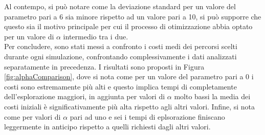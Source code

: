 Al contempo, si può notare come la deviazione standard per un valore del parametro pari a 6 sia minore rispetto ad un valore pari a 10, si può supporre che questo sia il motivo principale per cui il processo di otimizzazione abbia optato per un valore di $\alpha$ intermedio tra i due.\\
Per concludere, sono stati messi a confronto i costi medi dei percorsi scelti durante ogni simulazione, confrontando complessivamente i dati analizzati separatamente in precedenza.
I risultati sono proposti in Figura \ref{fig:alphaComparison}, dove si nota come per un valore del parametro pari a 0 i costi sono estremamente più alti e questo implica tempi di completamente dell'esplorazione maggiori, in aggiunta per valori di $\alpha$ molto bassi la media dei costi iniziali è significativamente più alta rispetto agli altri valori.
Infine, si nota come per valori di $\alpha$ pari ad uno e sei i tempi di eplsorazione finiscano leggermente in anticipo rispetto a quelli richiesti dagli altri valori.

